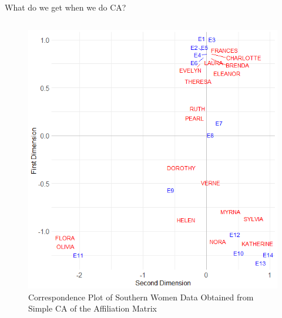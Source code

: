 \documentclass[
  ignorenonframetext,
]{beamer}
\begin{document}
\begin{frame}{What do we get when we do CA?}
\begin{columns}[T]
\begin{column}{0.5\textwidth}
\begin{figure}
{\centering \includegraphics{Plots/ca-sw.png}

}

\caption{Correspondence Plot of Southern Women Data Obtained from Simple
CA of the Affiliation Matrix}

\end{figure}
\end{column}
\end{columns}
\end{frame}
\end{document}
